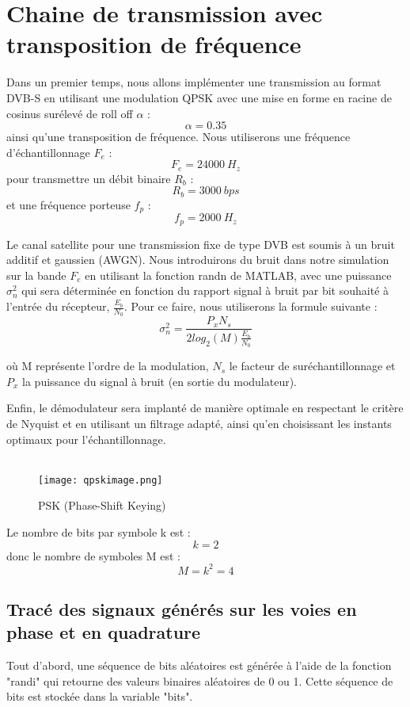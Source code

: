 \documentclass[11pt]{article}
\begin{document}
\newpage
\section{Chaine de transmission avec transposition de fréquence}
Dans un premier temps, nous allons implémenter une transmission au format DVB-S en utilisant une modulation QPSK avec une mise en forme en racine de cosinus surélevé de roll off $\alpha$ : 
$$\alpha = 0.35$$
ainsi qu'une transposition de fréquence. Nous utiliserons une fréquence d'échantillonnage $F_e$ :
$$F_e = 24000 \ H_z$$
pour transmettre un débit binaire $R_b$ :
$$R_b = 3000 \ bps$$
et une fréquence porteuse $f_p$ :
$$f_p = 2000 \ H_z$$

Le canal satellite pour une transmission fixe de type DVB est soumis à un bruit additif et gaussien (AWGN). Nous introduirons du bruit dans notre simulation sur la bande $F_e$ en utilisant la fonction randn de MATLAB, avec une puissance $\sigma_n^2$ qui sera déterminée en fonction du rapport signal à bruit par bit souhaité à l'entrée du récepteur, $\frac{E_b}{N_0}$. Pour ce faire, nous utiliserons la formule suivante :
$$\sigma_n^2 = \frac{P_xN_s}{2log_2(M) \frac{E_b}{N_0}}$$

où M représente l'ordre de la modulation, $N_s$ le facteur de suréchantillonnage et $P_x$ la puissance du signal à bruit (en sortie du modulateur).

Enfin, le démodulateur sera implanté de manière optimale en respectant le critère de Nyquist et en utilisant un filtrage adapté, ainsi qu'en choisissant les instants optimaux pour l'échantillonnage.\\\\

\begin{figure}[ht!]
    \centering
    \texttt{[image: qpskimage.png]}
    \caption{PSK (Phase-Shift Keying) \label{fig : chainetransmissioncomplete}}
\end{figure}
Le nombre de bits par symbole k est :
$$k = 2$$
donc le nombre de symboles M est :
$$M = k^2 = 4$$

\newpage
\subsection{Tracé des signaux générés sur les voies en phase et en quadrature}

Tout d'abord, une séquence de bits aléatoires est générée à l'aide de la fonction "randi" qui retourne des valeurs binaires aléatoires de 0 ou 1. Cette séquence de bits est stockée dans la variable "bits".
\end{document}
